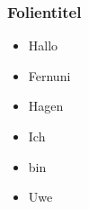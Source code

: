 \documentclass{beamer}
\begin{document}
\begin{frame}
	\frametitle{Folientitel}
	\begin{itemize}
		\item Hallo
		\item Fernuni
		\item Hagen
		\item Ich 
		\item bin 
		\item Uwe
	\end{itemize}
\end{frame}
	

	
\end{document}
